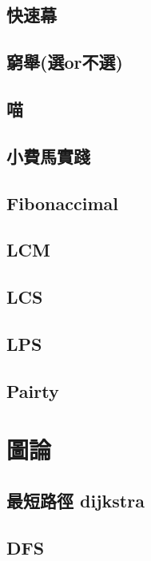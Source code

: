     \subsection{快速幕}
        
    \subsection{窮舉(選or不選)}
        
    \subsection{喵}
        
    \subsection{小費馬實踐}
        
    \subsection{Fibonaccimal}
        
    \subsection{LCM}
        
    \subsection{LCS}
        
    \subsection{LPS}
        
    \subsection{Pairty}
        

\section{圖論}
    \subsection{最短路徑 dijkstra}
        
    \subsection{DFS}
        
